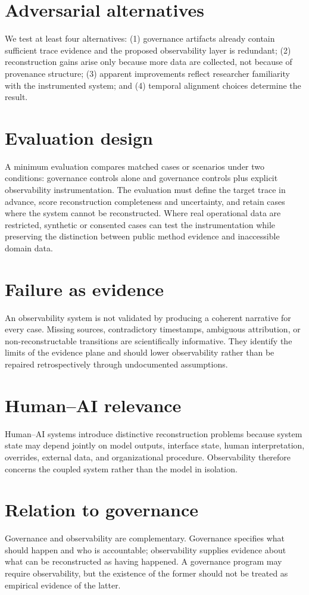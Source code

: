 \documentclass[11pt]{article}
\begin{document}
\section{Adversarial alternatives}
We test at least four alternatives: (1) governance artifacts already contain sufficient trace evidence and the proposed observability layer is redundant; (2) reconstruction gains arise only because more data are collected, not because of provenance structure; (3) apparent improvements reflect researcher familiarity with the instrumented system; and (4) temporal alignment choices determine the result.

\section{Evaluation design}
A minimum evaluation compares matched cases or scenarios under two conditions: governance controls alone and governance controls plus explicit observability instrumentation. The evaluation must define the target trace in advance, score reconstruction completeness and uncertainty, and retain cases where the system cannot be reconstructed. Where real operational data are restricted, synthetic or consented cases can test the instrumentation while preserving the distinction between public method evidence and inaccessible domain data.

\section{Failure as evidence}
An observability system is not validated by producing a coherent narrative for every case. Missing sources, contradictory timestamps, ambiguous attribution, or non-reconstructable transitions are scientifically informative. They identify the limits of the evidence plane and should lower observability rather than be repaired retrospectively through undocumented assumptions.

\section{Human--AI relevance}
Human--AI systems introduce distinctive reconstruction problems because system state may depend jointly on model outputs, interface state, human interpretation, overrides, external data, and organizational procedure. Observability therefore concerns the coupled system rather than the model in isolation.

\section{Relation to governance}
Governance and observability are complementary. Governance specifies what should happen and who is accountable; observability supplies evidence about what can be reconstructed as having happened. A governance program may require observability, but the existence of the former should not be treated as empirical evidence of the latter.
\end{document}
